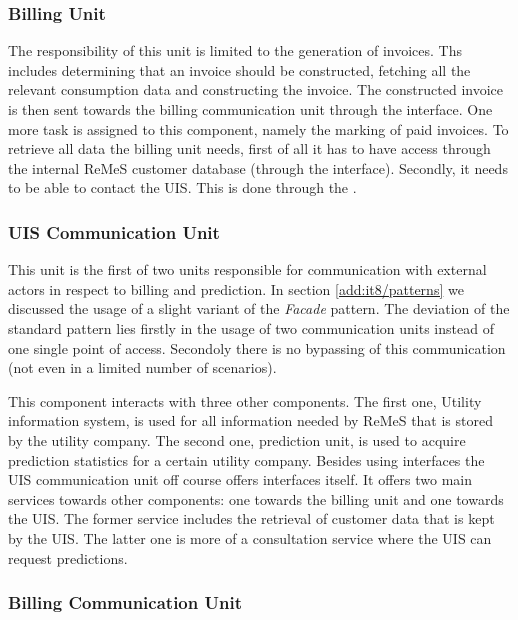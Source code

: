 \subsubsection{Billing Unit}

\npar The responsibility of this unit is limited to the generation of invoices.
Ths includes determining that an invoice should be constructed, fetching all the
relevant consumption data and constructing the invoice. The constructed invoice
is then sent towards the billing communication unit through the
 interface. One more task is assigned to this
component, namely the marking of paid invoices. To retrieve all data the
billing unit needs, first of all it has to have access through the internal
ReMeS customer database (through the  interface).
Secondly, it needs to be able to contact the UIS. This is done through the
.

\subsubsection{UIS Communication Unit}

\npar This unit is the first of two units responsible for communication with
external actors in respect to billing and prediction. In section
\ref{add:it8/patterns} we discussed the usage of a slight variant of the
\emph{Facade} pattern. The deviation of the standard pattern lies firstly in the
usage of two communication units instead of one single point of access.
Secondoly there is no bypassing of this communication (not even in a limited
number of scenarios).

\npar This component interacts with three other components. The first one,
Utility information system, is used for all information needed by ReMeS that is
stored by the utility company. The second one, prediction unit, is used to
acquire prediction statistics for a certain utility company. Besides using interfaces the UIS
communication unit off course offers interfaces itself. It offers two main
services towards other components: one towards the billing unit
and one towards the UIS. The former service includes the retrieval
of customer data that is kept by the UIS. The latter one is more of a
consultation service where the UIS can request predictions.

\subsubsection{Billing Communication Unit}

